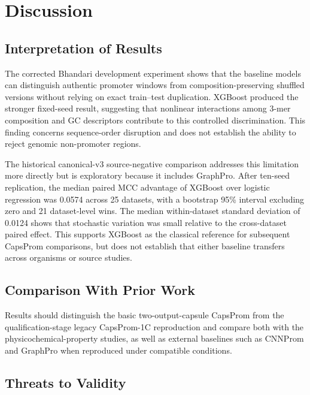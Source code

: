 \chapter{Discussion}\label{chap:discussion}

\section{Interpretation of Results}\label{sec:discussion-interpretation}

The corrected Bhandari development experiment shows that the baseline models
can distinguish authentic promoter windows from composition-preserving shuffled
versions without relying on exact train--test duplication. XGBoost produced the
stronger fixed-seed result, suggesting that nonlinear interactions among 3-mer
composition and GC descriptors contribute to this controlled discrimination.
This finding concerns sequence-order disruption and does not establish the
ability to reject genomic non-promoter regions.

The historical canonical-v3 source-negative comparison addresses this
limitation more directly but is exploratory because it includes GraphPro.
After ten-seed replication, the median paired MCC advantage of XGBoost over
logistic regression was 0.0574 across 25 datasets, with a bootstrap 95\%
interval excluding zero and 21 dataset-level wins. The median
within-dataset standard deviation of 0.0124 shows that stochastic variation was
small relative to the cross-dataset paired effect. This supports XGBoost as the
classical reference for subsequent CapsProm comparisons, but does not establish
that either baseline transfers across organisms or source studies.

\section{Comparison With Prior Work}\label{sec:discussion-prior-work}

Results should distinguish the basic two-output-capsule CapsProm from the
qualification-stage legacy CapsProm-1C reproduction and compare both with the
physicochemical-property studies, as well as external baselines such as CNNProm
and GraphPro when reproduced under compatible conditions.

\section{Threats to Validity}\label{sec:discussion-threats}

